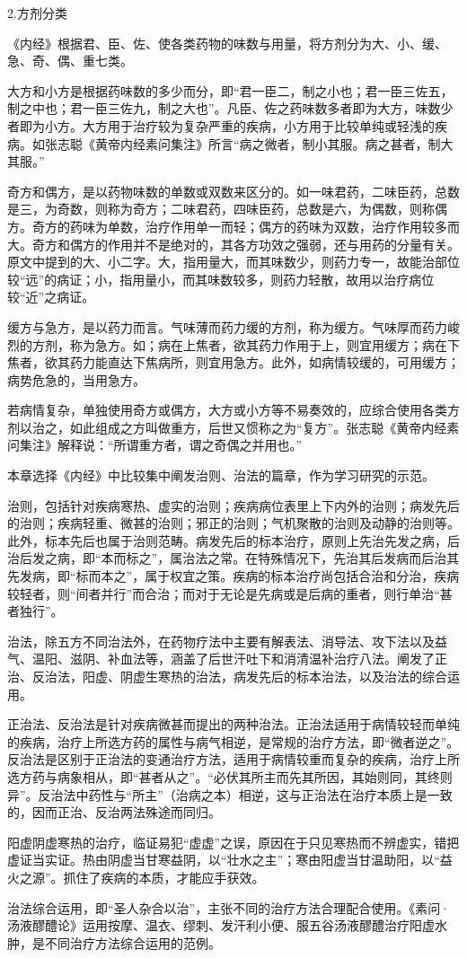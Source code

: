 \documentclass[draft,12pt]{ctexbook}
\begin{document}
2.方剂分类

《内经》根据君、臣、佐、使各类药物的味数与用量，将方剂分为大、小、缓、急、奇、偶、重七类。

大方和小方是根据药味数的多少而分，即“君一臣二，制之小也；君一臣三佐五，制之中也；君一臣三佐九，制之大也”。凡臣、佐之药味数多者即为大方，味数少者即为小方。大方用于治疗较为复杂严重的疾病，小方用于比较单纯或轻浅的疾病。如张志聪《黄帝内经素问集注》所言“病之微者，制小其服。病之甚者，制大其服。”

奇方和偶方，是以药物味数的单数或双数来区分的。如一味君药，二味臣药，总数是三，为奇数，则称为奇方；二味君药，四味臣药，总数是六，为偶数，则称偶方。奇方的药味为单数，治疗作用单一而轻；偶方的药味为双数，治疗作用较多而大。奇方和偶方的作用并不是绝对的，其各方功效之强弱，还与用药的分量有关。原文中提到的大、小二字。大，指用量大，而其味数少，则药力专一，故能治部位较“远”的病证；小，指用量小，而其味数较多，则药力轻散，故用以治疗病位较“近”之病证。

缓方与急方，是以药力而言。气味薄而药力缓的方剂，称为缓方。气味厚而药力峻烈的方剂，称为急方。如；病在上焦者，欲其药力作用于上，则宜用缓方；病在下焦者，欲其药力能直达下焦病所，则宜用急方。此外，如病情较缓的，可用缓方；病势危急的，当用急方。

若病情复杂，单独使用奇方或偶方，大方或小方等不易奏效的，应综合使用各类方剂以治之，如此组成之方叫做重方，后世又惯称之为“复方”。张志聪《黄帝内经素问集注》解释说：“所谓重方者，谓之奇偶之并用也。”

\xiaojie

本章选择《内经》中比较集中阐发治则、治法的篇章，作为学习研究的示范。

治则，包括针对疾病寒热、虚实的治则；疾病病位表里上下内外的治则；病发先后的治则；疾病轻重、微甚的治则；邪正的治则；气机聚散的治则及动静的治则等。此外，标本先后也属于治则范畴。病发先后的标本治疗，原则上先治先发之病，后治后发之病，即“本而标之”，属治法之常。在特殊情况下，先治其后发病而后治其先发病，即“标而本之”，属于权宜之策。疾病的标本治疗尚包括合治和分治，疾病较轻者，则“间者并行”而合治；而对于无论是先病或是后病的重者，则行单治“甚者独行”。

治法，除五方不同治法外，在药物疗法中主要有解表法、消导法、攻下法以及益气、温阳、滋阴、补血法等，涵盖了后世汗吐下和消清温补治疗八法。阐发了正治、反治法，阳虚、阴虚生寒热的治法，病发先后的标本治法，以及治法的综合运用。

正治法、反治法是针对疾病微甚而提出的两种治法。正治法适用于病情较轻而单纯的疾病，治疗上所选方药的属性与病气相逆，是常规的治疗方法，即“微者逆之”。反治法是区别于正治法的变通治疗方法，适用于病情较重而复杂的疾病，治疗上所选方药与病象相从，即“甚者从之”。“必伏其所主而先其所因，其始则同，其终则异”。反治法中药性与“所主”（治病之本）相逆，这与正治法在治疗本质上是一致的，因而正治、反治两法殊途而同归。

阳虚阴虚寒热的治疗，临证易犯“虚虚”之误，原因在于只见寒热而不辨虚实，错把虚证当实证。热由阴虚当甘寒益阴，以“壮水之主”；寒由阳虚当甘温助阳，以“益火之源”。抓住了疾病的本质，才能应手获效。

治法综合运用，即“圣人杂合以治”，主张不同的治疗方法合理配合使用。《素问·汤液醪醴论》运用按摩、温衣、缪刺、发汗利小便、服五谷汤液醪醴治疗阳虚水肿，是不同治疗方法综合运用的范例。

\ifx\allfiles\undefined
\end{document}
